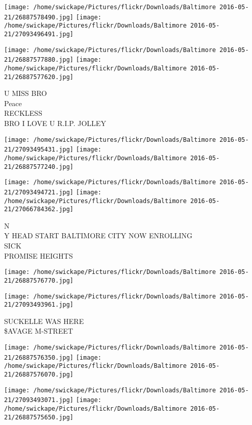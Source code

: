 \documentclass[10pt,letterpaper]{article}
\begin{document}
\texttt{[image: /home/swickape/Pictures/flickr/Downloads/Baltimore 2016-05-21/26887578490.jpg]}
\texttt{[image: /home/swickape/Pictures/flickr/Downloads/Baltimore 2016-05-21/27093496491.jpg]}

\texttt{[image: /home/swickape/Pictures/flickr/Downloads/Baltimore 2016-05-21/26887577880.jpg]}
\texttt{[image: /home/swickape/Pictures/flickr/Downloads/Baltimore 2016-05-21/26887577620.jpg]}

U MISS BRO\\
Peace\\
RECKLESS\\
BRO I LOVE U R.I.P. JOLLEY\\
\pagebreak

\texttt{[image: /home/swickape/Pictures/flickr/Downloads/Baltimore 2016-05-21/27093495431.jpg]}
\texttt{[image: /home/swickape/Pictures/flickr/Downloads/Baltimore 2016-05-21/26887577240.jpg]}

\texttt{[image: /home/swickape/Pictures/flickr/Downloads/Baltimore 2016-05-21/27093494721.jpg]}
\texttt{[image: /home/swickape/Pictures/flickr/Downloads/Baltimore 2016-05-21/27066784362.jpg]}

N\\
Y HEAD START BALTIMORE CITY NOW ENROLLING\\
SICK\\
PROMISE HEIGHTS\\
\pagebreak

\texttt{[image: /home/swickape/Pictures/flickr/Downloads/Baltimore 2016-05-21/26887576770.jpg]}

\vspace{0.25in}
\texttt{[image: /home/swickape/Pictures/flickr/Downloads/Baltimore 2016-05-21/27093493961.jpg]}

SUCKELLE WAS HERE\\
\$AVAGE M{-}STREET\\
\pagebreak

\texttt{[image: /home/swickape/Pictures/flickr/Downloads/Baltimore 2016-05-21/26887576350.jpg]}
\texttt{[image: /home/swickape/Pictures/flickr/Downloads/Baltimore 2016-05-21/26887576070.jpg]}

\texttt{[image: /home/swickape/Pictures/flickr/Downloads/Baltimore 2016-05-21/27093493071.jpg]}
\texttt{[image: /home/swickape/Pictures/flickr/Downloads/Baltimore 2016-05-21/26887575650.jpg]}
\end{document}
